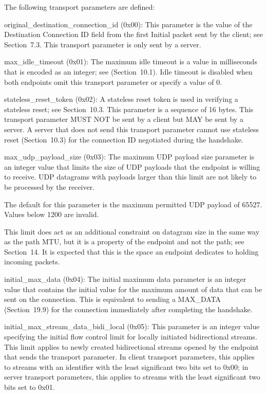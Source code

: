 \documentclass{article}
\begin{document}
The following transport parameters are defined:

original\_destination\_connection\_id (0x00):  This parameter is the value of the Destination Connection ID field from the first Initial packet sent by the client; see Section~7.3.  This transport parameter is only sent by a server.

max\_idle\_timeout (0x01):  The maximum idle timeout is a value in milliseconds that is encoded as an integer; see (Section~10.1). Idle timeout is disabled when both endpoints omit this transport parameter or specify a value of 0.

stateless\_reset\_token (0x02):  A stateless reset token is used in verifying a stateless reset; see Section~10.3.  This parameter is a sequence of 16 bytes.  This transport parameter MUST NOT be sent by a client but MAY be sent by a server.  A server that does not send this transport parameter cannot use stateless reset (Section~10.3) for the connection ID negotiated during the handshake.

max\_udp\_payload\_size (0x03):  The maximum UDP payload size parameter is an integer value that limits the size of UDP payloads that the endpoint is willing to receive.  UDP datagrams with payloads larger than this limit are not likely to be processed by the receiver.

The default for this parameter is the maximum permitted UDP payload of 65527.  Values below 1200 are invalid.

This limit does act as an additional constraint on datagram size in the same way as the path MTU, but it is a property of the endpoint and not the path; see Section~14.  It is expected that this is the space an endpoint dedicates to holding incoming packets.

initial\_max\_data (0x04):  The initial maximum data parameter is an integer value that contains the initial value for the maximum amount of data that can be sent on the connection.  This is equivalent to sending a MAX\_DATA (Section~19.9) for the connection immediately after completing the handshake.

initial\_max\_stream\_data\_bidi\_local (0x05):  This parameter is an integer value specifying the initial flow control limit for locally initiated bidirectional streams.  This limit applies to newly created bidirectional streams opened by the endpoint that sends the transport parameter.  In client transport parameters, this applies to streams with an identifier with the least significant two bits set to 0x00; in server transport parameters, this applies to streams with the least significant two bits set to 0x01.
\end{document}
